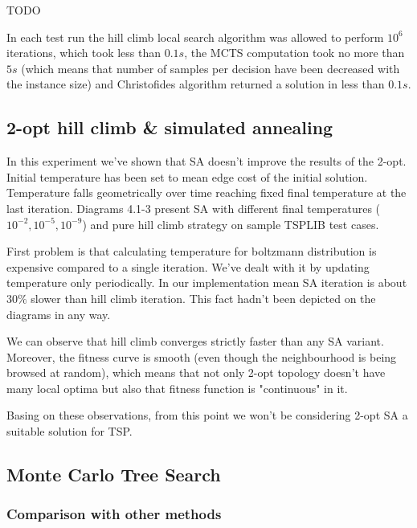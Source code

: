 TODO %

In each test run the hill climb local search algorithm was allowed to perform
$10^6$ iterations, which took less than $0.1 s$, the MCTS computation took
no more than $5 s$ (which means that number of samples per decision have been
decreased with the instance size) and Christofides algorithm returned a
solution in less than $0.1 s$. %



\subsection { 2-opt hill climb \& simulated annealing }

In this experiment we've shown that SA doesn't improve the results of the 2-opt.
Initial temperature has been set to mean edge cost of the initial solution.
Temperature falls geometrically over time reaching fixed final temperature at the last iteration.
Diagrams 4.1-3 present SA with different final temperatures ($10^{-2}, 10^{-5}, 10^{-9}$) and
pure hill climb strategy on sample TSPLIB test cases.





First problem is that calculating temperature for boltzmann distribution is
expensive compared to a single iteration. We've dealt with it by updating temperature
only periodically. In our implementation mean SA iteration is about $30\%$ slower than
hill climb iteration. This fact hadn't been depicted on the diagrams in any way.

We can observe that hill climb converges strictly faster than any SA variant.
Moreover, the fitness curve is smooth (even though the neighbourhood is being browsed at random),
which means that not only 2-opt topology doesn't have many local optima but also that fitness function
is "continuous" in it.

Basing on these observations, from this point we won't be considering 2-opt SA a
suitable solution for TSP.

\subsection{Monte Carlo Tree Search}

\subsubsection{Comparison with other methods}

